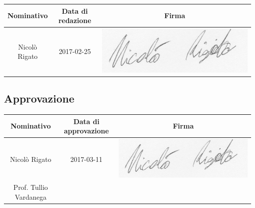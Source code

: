 \begin{center}
  \centering
  \begin{tabular}{|c|c|c|}
    \hline
    \textbf{Nominativo} & \textbf{Data di redazione} & \textbf{Firma} \\
    \hline
    Nicolò Rigato & 2017-02-25 & 
    \begin{minipage}{.3\textwidth}
      \includegraphics[width=\linewidth]{../../../file_comuni/firme/nr.jpg}
    \end{minipage}
 \\\hline
  \end{tabular}

\end{center}

\subsection{Approvazione}

\begin{center}
	\centering
	\begin{tabular}{|c|c|c|}
		\hline
		\textbf{Nominativo} & \textbf{Data di approvazione} & \textbf{Firma} \\
		\hline Nicolò Rigato & 2017-03-11 & 
    \begin{minipage}{.3\textwidth}
      \includegraphics[width=\linewidth]{../../../file_comuni/firme/nr.jpg}
    \end{minipage}
 \\
		\hline Prof. Tullio Vardanega &  &  \\[40pt]\hline
	\end{tabular}
	
\end{center}


